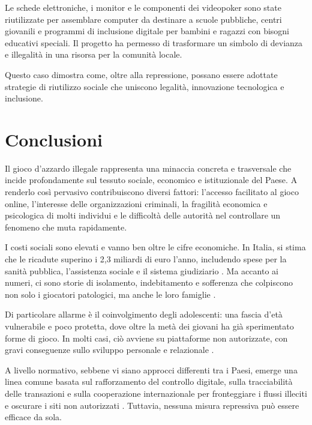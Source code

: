 \documentclass[a4paper,12pt]{article}
\begin{document}
Le schede elettroniche, i monitor e le componenti dei videopoker sono state riutilizzate per assemblare computer da destinare a scuole pubbliche, centri giovanili e programmi di inclusione digitale per bambini e ragazzi con bisogni educativi speciali. Il progetto ha permesso di trasformare un simbolo di devianza e illegalità in una risorsa per la comunità locale.
\cite{bento2010cheating}

Questo caso dimostra come, oltre alla repressione, possano essere adottate strategie di riutilizzo sociale che uniscono legalità, innovazione tecnologica e inclusione.

\section{Conclusioni}

Il gioco d’azzardo illegale rappresenta una minaccia concreta e trasversale che incide profondamente sul tessuto sociale, economico e istituzionale del Paese. A renderlo così pervasivo contribuiscono diversi fattori: l’accesso facilitato al gioco online, l’interesse delle organizzazioni criminali, la fragilità economica e psicologica di molti individui e le difficoltà delle autorità nel controllare un fenomeno che muta rapidamente.

I costi sociali sono elevati e vanno ben oltre le cifre economiche. In Italia, si stima che le ricadute superino i 2,3 miliardi di euro l’anno, includendo spese per la sanità pubblica, l’assistenza sociale e il sistema giudiziario \cite{lucchini2022socialcosts}. Ma accanto ai numeri, ci sono storie di isolamento, indebitamento e sofferenza che colpiscono non solo i giocatori patologici, ma anche le loro famiglie \cite{gorsane2017illegalacts}.

Di particolare allarme è il coinvolgimento degli adolescenti: una fascia d’età vulnerabile e poco protetta, dove oltre la metà dei giovani ha già sperimentato forme di gioco. In molti casi, ciò avviene su piattaforme non autorizzate, con gravi conseguenze sullo sviluppo personale e relazionale \cite{gori2014adolescentgambling}.

A livello normativo, sebbene vi siano approcci differenti tra i Paesi, emerge una linea comune basata sul rafforzamento del controllo digitale, sulla tracciabilità delle transazioni e sulla cooperazione internazionale per fronteggiare i flussi illeciti e oscurare i siti non autorizzati \cite{banks2018taxonomy}. Tuttavia, nessuna misura repressiva può essere efficace da sola.
\end{document}
